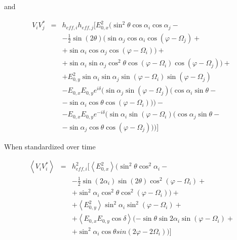 \documentclass[a4paper,14pt]{extbook}
\begin{document}
and

\begin{eqnarray}
V_i V_j^{*} &=& h_{eff,i} h_{eff,j}[E_{0,x}^2 (\sin^2 \theta \cos \alpha_i \cos \alpha_j - \\
& & - \frac{1}{2}  \sin(2\theta) (\sin \alpha_j \cos \alpha_i \cos(\varphi - \Omega_j)+ \nonumber \\
& & +\sin \alpha_i \cos \alpha_j \cos(\varphi - \Omega_i) )+ \nonumber \\
& & + \sin \alpha_i \sin \alpha_j \cos^2\theta \cos(\varphi - \Omega_i) \cos(\varphi - \Omega_j))+ \nonumber \\
& & + E_{0,y}^2 \sin \alpha_i \sin \alpha_j \sin (\varphi - \Omega_i) \sin (\varphi - \Omega_j)\nonumber \\
& & -E_{0,x} E_{0,y} e^{i \delta}( \sin \alpha_j \sin(\varphi - \Omega_j)( \cos \alpha_i \sin \theta - \nonumber \\
& &- \sin \alpha_i \cos \theta \cos(\varphi - \Omega_i)))-\nonumber \\
& &  -E_{0,x} E_{0,y} e^{-i \delta}( \sin \alpha_i \sin(\varphi - \Omega_i)( \cos \alpha_j \sin \theta - \nonumber \\
& & -\sin \alpha_j \cos \theta \cos(\varphi - \Omega_j)))]\nonumber
\end{eqnarray}

When standardized over time

\begin{eqnarray}
\left\langle V_i V_i^{*} \right\rangle &=&  h_{eff,i}^2[\left\langle E_{0,x}^2\right\rangle (\sin^2 \theta \cos^2 \alpha_i -\nonumber\\
& & -\frac{1}{2} \sin (2\alpha_i) \sin(2\theta) \cos^2(\varphi - \Omega_i) + \\
& & + \sin^2\alpha_i \cos^2\theta \cos^2(\varphi - \Omega_i))+ \nonumber \\
& & + \left\langle E_{0,y}^2 \right\rangle \sin^2\alpha_i \sin^2 (\varphi - \Omega_i)+ \nonumber \\
& & +  \left\langle E_{0,x} E_{0,y} \cos \delta \right\rangle (-\sin \theta \sin 2\alpha_i \sin(\varphi - \Omega_i) + \nonumber \\
& &+ \sin^2\alpha_i \cos \theta sin(2\varphi - 2\Omega_i)) ]\nonumber
\end{eqnarray}
\end{document}
